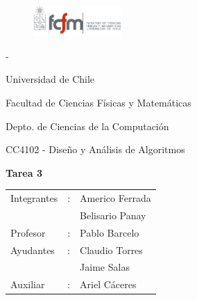 \documentclass[letterpaper,10pt]{article}
\begin{document}
	\begin{titlepage}

		\begin{figure}
			\includegraphics[width=0.3\textwidth]{logoFCFM.png}
		\end{figure}

		\noindent \phantom - %

		Universidad de Chile

		Facultad de Ciencias Físicas y Matemáticas

		Depto. de Ciencias de la Computación

		CC4102 - Diseño y Análisis de Algoritmos

		\vfill

		\begin{center}
			\begin{Huge}
				{\textbf{Tarea 3}}
			\end{Huge}
		\end{center}

		\vfill

		\begin{flushright}
			\begin{tabular}{lll}
				Integrantes	&:	& Americo Ferrada\\
						&	& Belisario Panay\\
				Profesor	&:	& Pablo Barcelo\\
				Ayudantes	&:	& Claudio Torres\\
						&	& Jaime Salas\\
				Auxiliar	&:	& Ariel Cáceres\\
			\end{tabular}
		\end{flushright}

	\end{titlepage}

	\newpage

	\tableofcontents
\end{document}
